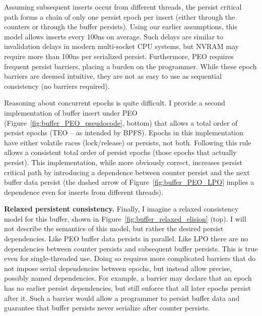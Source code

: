 Assuming subsequent inserts occur from different threads, the persist critical path forms a chain of only one persist epoch per insert (either through the counters or through the buffer persists).
Using our earlier assumptions, this model allows inserts every 100ns on average.
Such delays are similar to invalidation delays in modern multi-socket CPU systems, but NVRAM may require more than 100ns per serialized persist.
Furthermore, PEO requires frequent persist barriers, placing a burden on the programmer.
While these epoch barriers are deemed intuitive, they are not as easy to use as sequential consistency (no barriers required).

Reasoning about concurrent epochs is quite difficult.
I provide a second implementation of buffer insert under PEO (Figure~\ref{fig:buffer_PEO_pseudocode}, bottom) that allows a total order of persist epochs (TEO -- as intended by BPFS).
Epochs in this implementation have either volatile races (lock/release) or persists, not both.
Following this rule allows a consistent total order of persist epochs (those epochs that actually persist).
This implementation, while more obviously correct, increases persist critical path by introducing a dependence between counter persist and the next buffer data persist (the dashed arrow of Figure~\ref{fig:buffer_PEO_LPO} implies a dependence even for inserts from different threads).



\textbf{Relaxed persistent consistency.}
Finally, I imagine a relaxed consistency model for this buffer, shown in Figure~\ref{fig:buffer_relaxed_elision} (top).
I will not describe the semantics of this model, but rather the desired persist dependencies.
Like PEO buffer data persists in parallel.
Like LPO there are no dependencies between counter persists and subsequent buffer persists.
This is true even for single-threaded use.
Doing so requires more complicated barriers that do not impose serial dependencies between epochs, but instead allow precise, possibly named dependencies.
For example, a barrier may declare that an epoch has no earlier persist dependencies, but still enforce that all later epochs persist after it.
Such a barrier would allow a programmer to persist buffer data and guarantee that buffer persists never serialize after counter persists.

